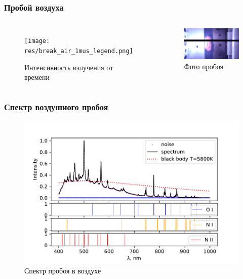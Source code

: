 \documentclass{beamer}
\begin{document}
	\begin{frame}
		\frametitle{Пробой воздуха}
		\begin{columns}
			\begin{figure}
				\centering
				\texttt{[image: res/break\_air\_1mus\_legend.png]}
				\caption*{Интенсивность излучения от времени}
			\end{figure}	
			\begin{figure}
				\centering
				\includegraphics[width=\linewidth]{res/spark_air.png}
				\caption*{Фото пробоя}
			\end{figure}
		\end{columns}
	\end{frame}	
	
	\begin{frame}
		\frametitle{Спектр воздушного пробоя}
		\begin{figure}
			\centering
			\includegraphics[width=\linewidth]{gen/air_lines.pdf}
			\caption*{Спектр пробоя в воздухе}
		\end{figure}
	\end{frame}
\end{document}
